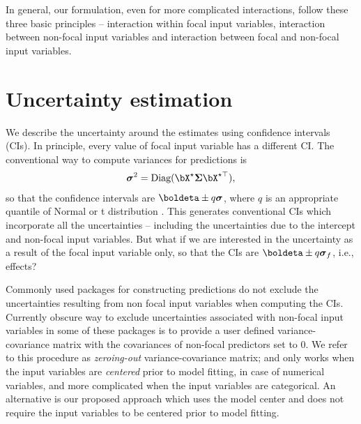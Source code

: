 In general, our formulation, even for more complicated interactions, follow these three basic principles -- interaction within focal input variables, interaction between non-focal input variables and interaction between focal and non-focal input variables.


\section{Uncertainty estimation}

We describe the uncertainty around the estimates using confidence intervals (CIs). In principle, every value of focal input variable has a different CI. The conventional way to compute variances for predictions is 
%
\begin{align}\label{eq:conventional_variance}
\boldsymbol\sigma^2 = \textrm{Diag}(\bX^\star \boldsymbol{\Sigma} \bX^{\star\top}), 
\end{align}
so that the confidence intervals are $\boldeta \pm q\boldsymbol\sigma$, where $q$ is an appropriate quantile of Normal or t distribution \citep{lenth2018package, fox2009effect}. This generates conventional CIs which incorporate all the uncertainties -- including the uncertainties due to the intercept and non-focal input variables.  But what if we are interested in the uncertainty as a result of the focal input variable only, so that the CIs are $\boldeta \pm q \boldsymbol \sigma_f$, i.e., effects? 

Commonly used  packages for constructing predictions do not exclude the uncertainties resulting from non focal input variables when computing the CIs. Currently obscure way to exclude uncertainties associated with non-focal input variables in some of these packages is to provide a user defined variance-covariance matrix with the covariances of non-focal predictors set to $0$. We refer to this procedure as \emph{zeroing-out} variance-covariance matrix; and only works when the input variables are \emph{centered} prior to model fitting, in case of numerical variables, and more complicated when the input variables are categorical. An alternative is our proposed approach which uses the model center and does not require the input variables to be centered prior to model fitting.

